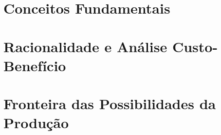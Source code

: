 \documentclass[table,handout]{beamer}
\begin{document}
\section{Conceitos Fundamentais}

\section{Racionalidade e An\'alise Custo-Benef\'icio}

\section{Fronteira das Possibilidades da Produ\c c\~ao}

% 
\end{document}
